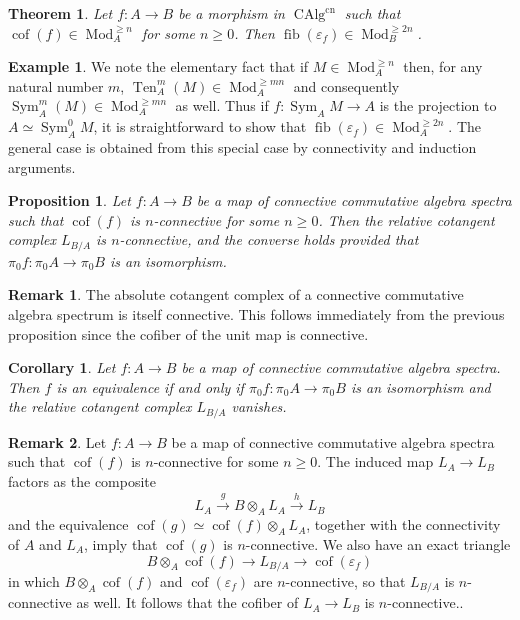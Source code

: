 \documentclass[12pt]{article}
\newtheorem{theorem}{Theorem}[subsection]
\newtheorem{corollary}{Corollary}[subsection]
\newtheorem{proposition}{Proposition}[subsection]
\theoremstyle{definition}
\newtheorem{example}{Example}[subsection]
\newtheorem{remark}{Remark}[subsection]
\newcommand{\too}{\longrightarrow}
\DeclareMathOperator{\Mod}{Mod}
\DeclareMathOperator{\CAlg}{CAlg}
\DeclareMathOperator{\cof}{cof}
\DeclareMathOperator{\Sym}{Sym}
\DeclareMathOperator{\fib}{fib}
\DeclareMathOperator{\Ten}{Ten}
\newcommand{\cn}{\mathrm{cn}}
\renewcommand{\epsilon}{\varepsilon}
\begin{document}
\begin{theorem}{\em \cite[Theorem 7.4.3.1]{HA}}\label{thm:2ncon}
Let $f:A\to B$ be a morphism in $\CAlg^{\cn}$ such that $\cof(f)\in\Mod_A^{\geq n}$ for some $n\geq 0$.
Then $\fib(\epsilon_f)\in\Mod_B^{\geq 2n}$.
\end{theorem}

\begin{example}
We note the elementary fact that if $M\in\Mod_A^{\geq n}$ then, for any natural number $m$, $\Ten_A^m(M)\in\Mod_A^{\geq mn}$ and consequently $\Sym_A^m(M)\in\Mod_A^{\geq mn}$ as well.
Thus if $f:\Sym_A M\to A$ is the projection to $A\simeq\Sym^0_A M$, it is straightforward to show that $\fib(\epsilon_f)\in\Mod_A^{\geq 2n}$.
The general case is obtained from this special case by connectivity and induction arguments.
\end{example}

\begin{proposition}{\em \cite[Corollary 7.4.3.2]{HA}}
Let $f:A\to B$ be a map of connective commutative algebra spectra such that $\cof(f)$ is
$n$-connective for some $n\geq 0$. Then the relative cotangent complex $L_{B/A}$ is $n$-connective, and the converse holds provided that $\pi_0 f:\pi_0 A\to\pi_0 B$ is an isomorphism.
\end{proposition}

\begin{remark}
The absolute cotangent complex of a connective commutative algebra spectrum is
itself connective.
This follows immediately from the previous proposition since the cofiber of the unit map is connective.
\end{remark}
\begin{corollary}
 Let $f : A\to B$ be a map of connective commutative algebra spectra. Then $f$ is an equivalence if
and only if $\pi_0 f:\pi_0 A\to\pi_0 B$ is an isomorphism and the relative cotangent complex $L_{B/A}$ vanishes.
\end{corollary}
\begin{remark}
Let $f : A\to B$ be a map of connective commutative algebra spectra such that $\cof(f)$ is $n$-connective for some $n \geq 0$.
The induced map $L_A\to L_B$ factors as the composite
\[
L_A\overset{g}{\too} B\otimes_A L_A\overset{h}{\too} L_B
\]
and the equivalence $\cof(g)\simeq\cof(f)\otimes_A L_A$, together with the connectivity of $A$ and $L_A$, imply that $\cof(g)$ is $n$-connective.
We also have an exact triangle
\[
B\otimes_A\cof(f)\too L_{B/A}\too\cof(\epsilon_f)
\]
in which $B\otimes_A\cof(f)$ and $\cof(\epsilon_f)$ are $n$-connective, so that $L_{B/A}$ is $n$-connective as well.
It follows that the cofiber of $L_A\to L_B$ is $n$-connective..
\end{remark}
\end{document}
